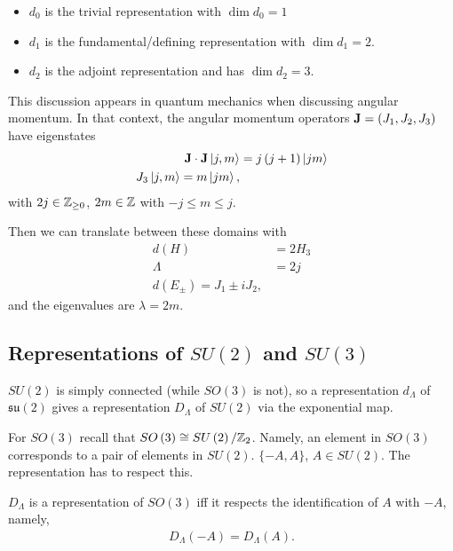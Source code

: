 \begin{itemize}
    \item $d_0$ is the trivial representation with $\dim d_0 = 1$
    \item $d_1$ is the fundamental/defining representation with $\dim d_1 = 2$.
        \item $d_2$ is the adjoint representation and has $\dim d_2 = 3$.
\end{itemize}

This discussion appears in quantum mechanics when discussing angular momentum. In that context, the angular momentum operators $\vb{J} = \left( J_1 , J_2 , J_3 \right) $ have eigenstates
\begin{align}
    \vb{J} \cdot \vb{J} \ket{j,m} &= j \left( j + 1 \right) \ket{j m} \\
    J_3 \ket{j,m} = m \ket{jm}
,\end{align}
with $2 j \in \mathbb{Z}_{\geq 0}$, $2m \in \mathbb{Z}$ with $-j \leq m \leq j$.

Then we can translate between these domains with
\begin{align}
    d \left( H \right) &= 2 H_3 \\
    \Lambda &= 2j \\
    d \left( E_{\pm} \right) = J_1 \pm i J_2
,\end{align}
and the eigenvalues are $\lambda = 2m$.

\subsection{Representations of $SU \left( 2 \right) $ and $SU \left( 3 \right) $}

$SU \left( 2 \right) $ is simply connected (while $SO \left( 3 \right) $ is not), so a representation $d_{\Lambda}$ of $\mathfrak{su}\left( 2 \right)$ gives a representation $D_{\Lambda}$ of $SU\left( 2 \right) $ via the exponential map.

For $SO \left( 3 \right) $ recall that $SO \left( 3 \right) \cong SU \left( 2 \right) / \mathbb{Z}_2$. Namely, an element in $SO \left( 3 \right) $ corresponds to a pair of elements in $SU \left( 2 \right) $. $\{-A,A\} $, $A \in SU \left( 2 \right) $. The representation has to respect this.

$D_{\Lambda}$ is a representation of $SO \left( 3 \right) $ iff it respects the identification of $A$ with $-A$, namely,
\begin{align}
    D_{\Lambda} \left( -A \right) = D_{\Lambda} \left( A \right) 
.\end{align}


